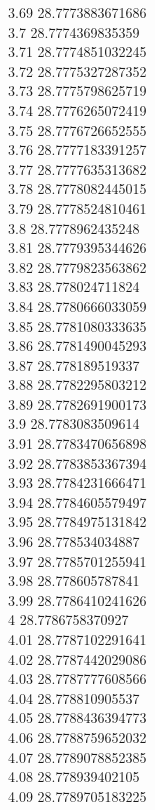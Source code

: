{3.69	28.7773883671686\\
3.7	28.7774369835359\\
3.71	28.7774851032245\\
3.72	28.7775327287352\\
3.73	28.7775798625719\\
3.74	28.7776265072419\\
3.75	28.7776726652555\\
3.76	28.7777183391257\\
3.77	28.7777635313682\\
3.78	28.7778082445015\\
3.79	28.7778524810461\\
3.8	28.7778962435248\\
3.81	28.7779395344626\\
3.82	28.7779823563862\\
3.83	28.778024711824\\
3.84	28.7780666033059\\
3.85	28.7781080333635\\
3.86	28.7781490045293\\
3.87	28.778189519337\\
3.88	28.7782295803212\\
3.89	28.7782691900173\\
3.9	28.7783083509614\\
3.91	28.7783470656898\\
3.92	28.7783853367394\\
3.93	28.7784231666471\\
3.94	28.7784605579497\\
3.95	28.7784975131842\\
3.96	28.778534034887\\
3.97	28.7785701255941\\
3.98	28.778605787841\\
3.99	28.7786410241626\\
4	28.7786758370927\\
4.01	28.7787102291641\\
4.02	28.7787442029086\\
4.03	28.7787777608566\\
4.04	28.778810905537\\
4.05	28.7788436394773\\
4.06	28.7788759652032\\
4.07	28.7789078852385\\
4.08	28.778939402105\\
4.09	28.7789705183225\\
}
